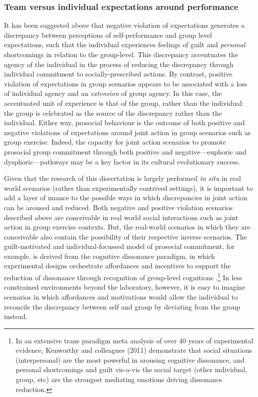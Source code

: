\begin{CJK}{UTF8}{gbsn}
\subsubsection{Team versus individual expectations around performance}
It has been suggested above that negative violation of expectations generates a discrepancy between perceptions of self-performance and group level expectations, such that the individual experiences feelings of guilt and \textit{personal} shortcomings in relation to the group-level.   This discrepancy accentuates the agency of the individual in the process of reducing the discrepancy through individual commitment to socially-prescribed actions.  By contrast, positive violation of expectations in group scenarios appears to be associated with a loss of individual agency and an \textit{extension} of group agency.  In this case, the accentuated unit of experience is that of the group, rather than the individual: the group is celebrated as the source of the discrepancy rather than the individual.  Either way, prosocial behaviour is the outcome of both positive and negative violations of expectations around joint action in group scenarios such as group exercise.  Indeed, the capacity for joint action scenarios to promote prosocial group commitment through both positive and negative---euphoric and dysphoric---pathways may be a key factor in its cultural evolutionary success.

Given that the research of this dissertation is largely performed \textit{in situ} in real world scenarios (rather than experimentally contrived settings), it is important to add a layer of nuance to the possible ways in which discrepancies in joint action can be aroused and reduced.  Both negative and positive violation scenarios described above are conceivable in real world social interactions such as joint action in group exercise contexts. But, the real-world scenarios in which they are conceivable also contain the possibility of their respective inverse scenarios.  The guilt-motivated and individual-focussed model of prosocial commitment, for example, is derived from the cognitive dissonance paradigm, in which experimental designs orchestrate affordances and incentives to support the reduction of dissonance through recognition of group-level cognitions \citep{Kenworthy2011}.\footnote{In an extensive trans paradigm meta analysis of over 40 years of experimental evidence, Kenworthy and colleagues (2011) demonstrate that social situations (interpersonal) are the most powerful in arousing cognitive dissonance, and personal shortcomings and guilt vis-a-vis the social target (other individual, group, etc) are the strongest mediating emotions driving dissonance reduction.}  In less constrained environments beyond the laboratory, however, it is easy to imagine scenarios in which affordances and motivations would allow the individual to reconcile the discrepancy between self and group by deviating from the group instead.


\end{CJK}
